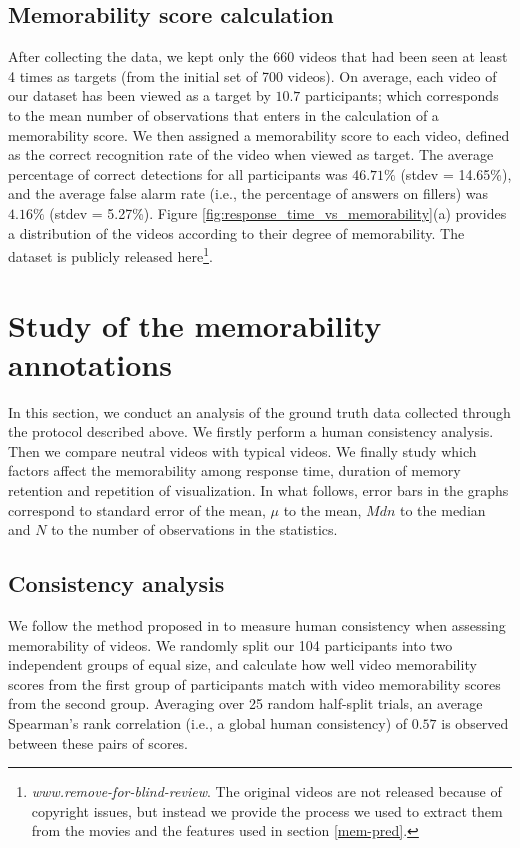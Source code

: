 \documentclass[sigconf]{acmart}
\begin{document}
\subsection{Memorability score calculation}
After collecting the data, we kept only the 660 videos that had been seen at least 4 times as targets (from the initial set of 700 videos).
On average, each video of our dataset has been viewed as a target by $10.7$ participants; which corresponds to the mean number of observations that enters in the calculation of a memorability score.
We then assigned a memorability score to each video, defined as the correct recognition rate of the video when viewed as target.
The average percentage of correct detections for all participants was $46.71\%$ (stdev = 14.65\%), and the average false alarm rate (i.e., the percentage of answers on fillers) was $4.16\%$ (stdev = 5.27\%).
Figure \ref{fig:response_time_vs_memorability}(a) provides a distribution of the videos according to their degree of memorability.
The dataset is publicly released here\footnote{\textit{www.remove-for-blind-review}. The original videos are not released because of copyright issues, but instead we provide the process we used to extract them from the movies and the features used in section \ref{mem-pred}.}.

\section{Study of the memorability annotations}
\label{study_memorability}
In this section, we conduct an analysis of the ground truth data collected through the protocol described above.
We firstly perform a human consistency analysis.
Then we compare neutral videos with typical videos.
We finally study which factors affect the memorability among response time, duration of memory retention and repetition of visualization.
In what follows, error bars in the graphs correspond to standard error of the mean, $\mu$ to the mean, $Mdn$ to the median and $N$ to the number of observations in the statistics.

\subsection{Consistency analysis}
\label{ssec:human}
We follow the method proposed in \cite{isola_2014_makes} to measure human consistency when assessing memorability of videos.
We randomly split our 104 participants into two independent groups of equal size, and calculate how well video memorability scores from the first group of participants match with video memorability scores from the second group.
Averaging over 25 random half-split trials, an average Spearman's rank correlation (i.e., a global human consistency) of $0.57$ is observed between these pairs of scores.
\end{document}
